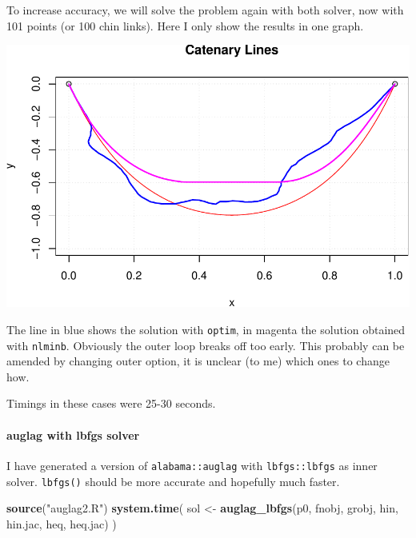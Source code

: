 \documentclass[]{article}
\newenvironment{Shaded}{\begin{snugshade}}{\end{snugshade}}
\newcommand{\KeywordTok}[1]{\textcolor[rgb]{0.13,0.29,0.53}{\textbf{{#1}}}}
\newcommand{\StringTok}[1]{\textcolor[rgb]{0.31,0.60,0.02}{{#1}}}
\newcommand{\NormalTok}[1]{{#1}}
\let\oldparagraph\paragraph
\renewcommand{\paragraph}[1]{\oldparagraph{#1}\mbox{}}
\begin{document}
To increase accuracy, we will solve the problem again with both solver,
now with 101 points (or 100 chin links). Here I only show the results in
one graph.

\includegraphics{catenary_files/figure-latex/unnamed-chunk-10-1.pdf}

The line in blue shows the solution with \texttt{optim}, in magenta the
solution obtained with \texttt{nlminb}. Obviously the outer loop breaks
off too early. This probably can be amended by changing outer option, it
is unclear (to me) which ones to change how.

Timings in these cases were 25-30 seconds.

\paragraph{auglag with lbfgs solver}\label{auglag-with-lbfgs-solver}

I have generated a version of \texttt{alabama::auglag} with
\texttt{lbfgs::lbfgs} as inner solver. \texttt{lbfgs()} should be more
accurate and hopefully much faster.

\begin{Shaded}
\begin{Highlighting}[]
\KeywordTok{source}\NormalTok{(}\StringTok{"auglag2.R"}\NormalTok{)}
\KeywordTok{system.time}\NormalTok{(}
    \NormalTok{sol <-}\StringTok{ }\KeywordTok{auglag_lbfgs}\NormalTok{(p0, fnobj, grobj, hin, hin.jac, heq, heq.jac)}
\NormalTok{)}
\end{Highlighting}
\end{Shaded}
\end{document}
